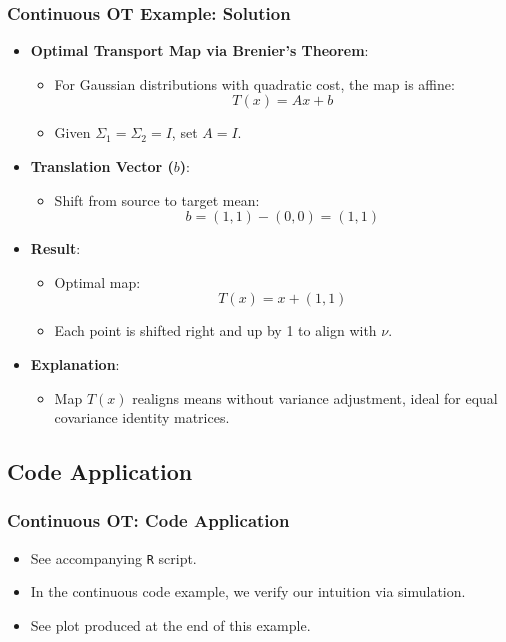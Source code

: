 \documentclass{beamer}
\begin{document}
	\begin{frame}
		\frametitle{Continuous OT Example: Solution}
		\begin{itemize}
			\item \textbf{Optimal Transport Map via Brenier's Theorem}:
			\begin{itemize}
				\item For Gaussian distributions with quadratic cost, the map is affine:
				\[
				T(x) = Ax + b
				\]
				\item Given \(\Sigma_1 = \Sigma_2 = I\), set \(A = I\).
			\end{itemize}
			
			\item \textbf{Translation Vector (\(b\))}:
			\begin{itemize}
				\item Shift from source to target mean: 
				\[
				b = (1, 1) - (0, 0) = (1, 1)
				\]
			\end{itemize}
			
			\item \textbf{Result}:
			\begin{itemize}
				\item Optimal map: 
				\[
				T(x) = x + (1, 1)
				\]
				\item Each point is shifted right and up by 1 to align with \(\nu\).
			\end{itemize}
			
			\item \textbf{Explanation}:
			\begin{itemize}
				\item Map \(T(x)\) realigns means without variance adjustment, ideal for equal covariance identity matrices.
			\end{itemize}
		\end{itemize}
	\end{frame}
	
	
	\subsection{Code Application}
	\begin{frame}
		\frametitle{Continuous OT: Code Application}
		\begin{itemize}
			\item See accompanying \texttt{R} script.
			\item In the continuous code example, we verify our intuition via simulation.
			\item See plot produced at the end of this example.
		\end{itemize}
	\end{frame}
	
\end{document}
